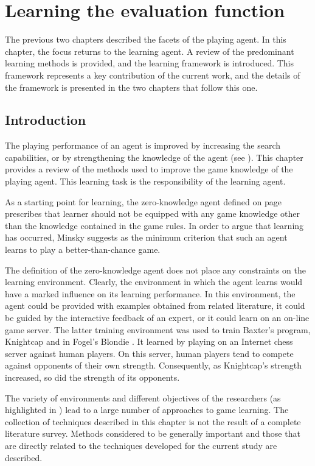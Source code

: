 \chapter{Learning the evaluation function}
\label{chap:learning}
{\chapterintro
The previous two chapters described the facets of the playing agent.  In this chapter, the focus returns to the learning agent.  A review of the predominant learning methods is provided, and the learning framework is introduced.  This framework represents a key contribution of the current work, and the details of the framework is presented in the two chapters that follow this one.
}
\section{Introduction}
The playing performance of an agent is improved by increasing the search capabilities, or by strengthening the knowledge of the agent (see ).  This chapter provides a review of the methods used to improve the game knowledge of the playing agent.  This learning task is the responsibility of the learning agent.    

As a starting point for learning, the zero-knowledge agent defined on page \pageref{def:zero} prescribes that learner should not be equipped with any game knowledge other than the knowledge contained in the game rules.  In order to argue that learning has occurred, Minsky \cite{minsky:steps} suggests as the minimum criterion that such an agent learns to play a better-than-chance game. 

The definition of the zero-knowledge agent does not place any constraints on the learning environment. Clearly, the environment in which the agent learns would have a marked influence on its learning performance.  In this environment, the agent could be provided with examples obtained from related literature, it could be guided by the interactive feedback of an expert, or it could learn on an on-line game server.  The latter training environment was used to train Baxter's  program, Knightcap \cite{baxter:chess} and in Fogel's Blondie \cite{fogel:edge}. It learned by playing on an Internet chess server against human players. On this server, human players tend to compete against opponents of their own strength.  Consequently, as Knightcap's strength increased, so did the strength of its opponents.  

The variety of environments and different objectives of the researchers (as highlighted in ) lead to a large number of approaches to game learning.  The collection of techniques described in this chapter is not the result of a complete literature survey.  Methods considered to be  generally important and those that are directly related to the techniques developed for the current study are described.

